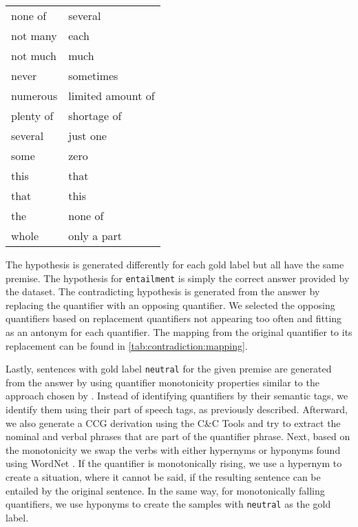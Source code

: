 \begin{table}[ht!]
\begin{tabular}{l | l}
        none of &  several \\
        not many &  each \\
        not much &  much \\
        never &  sometimes \\
        numerous &  limited amount of \\
        plenty of &  shortage of \\
        several &  just one \\
        some &  zero \\
        this &  that \\
        that &  this \\
        the &  none of \\
        whole &  only a part
    \end{tabular}
    \label{tab:contradiction:mapping}
\end{table}

The hypothesis is generated differently for each gold label but all have the same premise. The hypothesis for \texttt{entailment} is simply the correct answer provided by the dataset. The contradicting hypothesis is generated from the answer by replacing the quantifier with an opposing quantifier. We selected the opposing quantifiers based on replacement quantifiers not appearing too often and fitting as an antonym for each quantifier. The mapping from the original quantifier to its replacement can be found in \autoref{tab:contradiction:mapping}.

Lastly, sentences with gold label \texttt{neutral} for the given premise are generated from the answer by using quantifier monotonicity properties similar to the approach chosen by \citet{yanaka-etal-2019-help}. Instead of identifying quantifiers by their semantic tags, we identify them using their part of speech tags, as previously described. Afterward, we also generate a \ac{CCG} derivation using the C\&C Tools \cite{curran-etal-2007-linguistically} and try to extract the nominal and verbal phrases that are part of the quantifier phrase. Next, based on the monotonicity we swap the verbs with either hypernyms or hyponyms found using WordNet \cite{miller-1994-wordnet}. If the quantifier is monotonically rising, we use a hypernym to create a situation, where it cannot be said, if the resulting sentence can be entailed by the original sentence. In the same way, for monotonically falling quantifiers, we use hyponyms to create the samples with \texttt{neutral} as the gold label.
